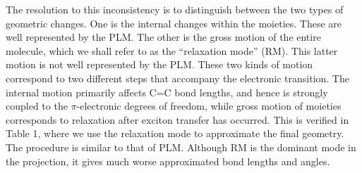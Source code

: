 


The resolution to this inconsistency is to distinguish between the two types of geometric changes.
One is the internal changes within  the moieties.  These are well represented  by the PLM.
The other is the gross motion of the entire molecule, which we shall refer to as the ``relaxation mode'' (RM).  This latter motion
is not well represented by the PLM.
 These two kinds of motion  correspond to two different steps that accompany the electronic  transition. The
internal motion primarily affects C=C bond lengths,  and
hence is strongly coupled to the $\pi$-electronic degrees of freedom, while gross motion of moieties corresponds
to  relaxation after exciton transfer has occurred. This is verified in Table 1, where we use the relaxation mode to approximate the final geometry. The procedure is similar to that of PLM. Although RM is the dominant mode in the projection, it gives much worse approximated bond lengths and angles.

